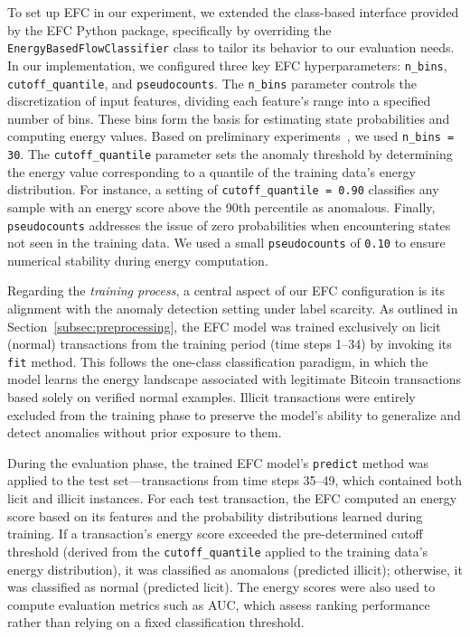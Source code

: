 \documentclass[12pt]{article}
\begin{document}
To set up EFC in our experiment, we extended the class-based interface provided by the EFC Python package, specifically
by overriding the \texttt{EnergyBasedFlowClassifier} class to tailor its behavior to our evaluation needs. In our implementation,
we configured three key EFC hyperparameters: \texttt{n\_bins}, \texttt{cutoff\_quantile}, and \texttt{pseudocounts}.
The \texttt{n\_bins} parameter controls the discretization of input features, dividing each feature's range into a specified
number of bins. These bins form the basis for estimating state probabilities and computing energy values. Based on preliminary
experiments~\cite{reproducibility}, we used \texttt{n\_bins = 30}. The \texttt{cutoff\_quantile} parameter sets the anomaly
threshold by determining the energy value corresponding to a quantile of the training data's energy distribution. For instance,
a setting of \texttt{cutoff\_quantile = 0.90} classifies any sample with an energy score above the 90th percentile as anomalous.
Finally, \texttt{pseudocounts} addresses the issue of zero probabilities when encountering states not seen in the training
data. We used a small \texttt{pseudocounts} of \texttt{0.10} to ensure numerical stability during energy computation.

Regarding the \emph{training process}, a central aspect of our EFC configuration is its alignment with the anomaly detection
setting under label scarcity. As outlined in Section~\ref{subsec:preprocessing}, the EFC model was trained exclusively on
licit (normal) transactions from the training period (time steps 1--34) by invoking its \texttt{fit} method. This follows
the one-class classification paradigm, in which the model learns the energy landscape associated with legitimate Bitcoin
transactions based solely on verified normal examples. Illicit transactions were entirely excluded from the training phase
to preserve the model's ability to generalize and detect anomalies without prior exposure to them.

During the evaluation phase, the trained EFC model's \texttt{predict} method was applied to the test set---transactions
from time steps 35--49, which contained both licit and illicit instances. For each test transaction, the EFC computed an
energy score based on its features and the probability distributions learned during training. If a transaction's energy
score exceeded the pre-determined cutoff threshold (derived from the \texttt{cutoff\_quantile} applied to the training data's
energy distribution), it was classified as anomalous (predicted illicit); otherwise, it was classified as normal (predicted licit).
The energy scores were also used to compute evaluation metrics such as AUC, which assess ranking performance rather than
relying on a fixed classification threshold.
\end{document}
